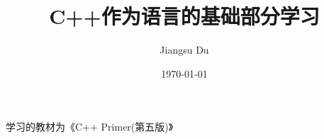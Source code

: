 \documentclass[UTF8]{ctexart}
\title{C++作为语言的基础部分学习}
\author{Jiangsu Du}
\date{\today}
\begin{document}
\maketitle
学习的教材为《C++ Primer(第五版)》
\tableofcontents




\end{document}
